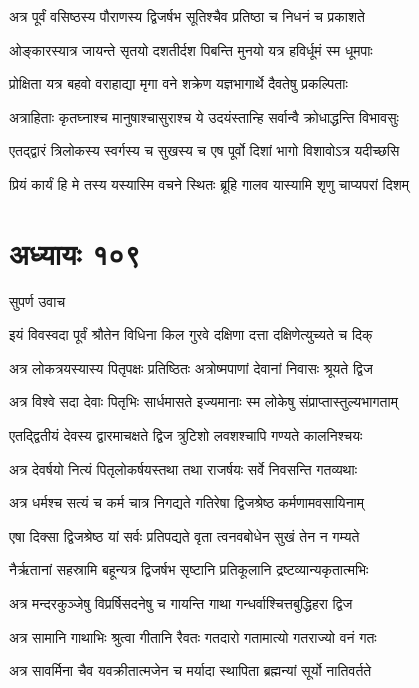 \twolineshloka
{अत्र पूर्वं वसिष्ठस्य पौराणस्य द्विजर्षभ}
{सूतिश्चैव प्रतिष्ठा च निधनं च प्रकाशते}


\twolineshloka
{ओङ्कारस्यात्र जायन्ते सृतयो दशतीर्दश}
{पिबन्ति मुनयो यत्र हविर्धूमं स्म धूमपाः}


\twolineshloka
{प्रोक्षिता यत्र बहवो वराहाद्या मृगा वने}
{शक्रेण यज्ञभागार्थे दैवतेषु प्रकल्पिताः}


\twolineshloka
{अत्राहिताः कृतघ्नाश्च मानुषाश्चासुराश्च ये}
{उदयंस्तान्हि सर्वान्वै क्रोधाद्धन्ति विभावसुः}


\twolineshloka
{एतद्द्वारं त्रिलोकस्य स्वर्गस्य च सुखस्य च}
{एष पूर्वो दिशां भागो विशावोऽत्र यदीच्छसि}


\twolineshloka
{प्रियं कार्यं हि मे तस्य यस्यास्मि वचने स्थितः}
{ब्रूहि गालव यास्यामि शृणु चाप्यपरां दिशम्}


\chapter{अध्यायः १०९}
\twolineshloka
{सुपर्ण उवाच}
{}


\twolineshloka
{इयं विवस्वदा पूर्वं श्रौतेन विधिना किल}
{गुरवे दक्षिणा दत्ता दक्षिणेत्युच्यते च दिक्}


\twolineshloka
{अत्र लोकत्रयस्यास्य पितृपक्षः प्रतिष्ठितः}
{अत्रोष्मपाणां देवानां निवासः श्रूयते द्विज}


\twolineshloka
{अत्र विश्वे सदा देवाः पितृभिः सार्धमासते}
{इज्यमानाः स्म लोकेषु संप्राप्तास्तुल्यभागताम्}


\twolineshloka
{एतद्द्वितीयं देवस्य द्वारमाचक्षते द्विज}
{त्रुटिशो लवशश्चापि गण्यते कालनिश्चयः}


\twolineshloka
{अत्र देवर्षयो नित्यं पितृलोकर्षयस्तथा}
{तथा राजर्षयः सर्वे निवसन्ति गतव्यथाः}


\twolineshloka
{अत्र धर्मश्च सत्यं च कर्म चात्र निगद्यते}
{गतिरेषा द्विजश्रेष्ठ कर्मणामवसायिनाम्}


\twolineshloka
{एषा दिक्सा द्विजश्रेष्ठ यां सर्वः प्रतिपद्यते}
{वृता त्वनवबोधेन सुखं तेन न गम्यते}


\twolineshloka
{नैर्ऋतानां सहस्रामि बहून्यत्र द्विजर्षभ}
{सृष्टानि प्रतिकूलानि द्रष्टव्यान्यकृतात्मभिः}


\twolineshloka
{अत्र मन्दरकुञ्जेषु विप्रर्षिसदनेषु च}
{गायन्ति गाथा गन्धर्वाश्चित्तबुद्धिहरा द्विज}


\twolineshloka
{अत्र सामानि गाथाभिः श्रुत्वा गीतानि रैवतः}
{गतदारो गतामात्यो गतराज्यो वनं गतः}


\twolineshloka
{अत्र सावर्मिना चैव यवक्रीतात्मजेन च}
{मर्यादा स्थापिता ब्रह्मन्यां सूर्यो नातिवर्तते}


